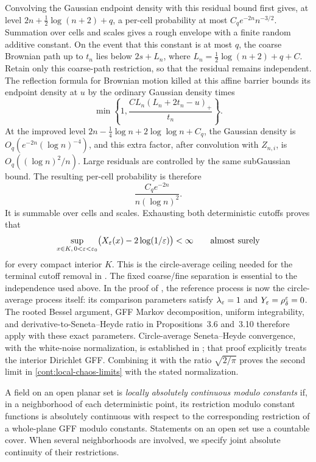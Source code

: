Convolving the Gaussian endpoint density with this residual bound first
gives, at level $2n+\frac12\log(n+2)+q$, a per-cell probability at most
$C_q e^{-2n}n^{-3/2}$.  Summation over cells and scales gives a rough envelope
with a finite random additive constant.  On the event that this constant is
at most $q$, the coarse Brownian path up to $t_n$ lies below
$2s+L_n$, where $L_n=\frac12\log(n+2)+q+C$.  Retain only this coarse-path
restriction, so that the residual remains independent.  The reflection
formula for Brownian motion killed at this affine barrier bounds its
endpoint density at $u$ by the ordinary Gaussian density times
\[
 \min\left\{1,\frac{C L_n(L_n+2t_n-u)_+}{t_n}\right\}.
\]
At the improved level
$2n-\frac14\log n+2\log\log n+C_q$, the Gaussian density is
$O_q(e^{-2n}(\log n)^{-4})$, and this extra factor, after convolution with
$Z_{n,i}$, is $O_q((\log n)^2/n)$.  Large residuals are controlled by the
same subGaussian bound.  The resulting per-cell probability is therefore
\[
                  \frac{C_q e^{-2n}}{n(\log n)^2}.
\]
It is summable over cells and scales.  Exhausting both deterministic cutoffs
proves that
\[
 \sup_{x\in K,\,0<\varepsilon<\varepsilon_0}
       \bigl(X_\varepsilon(x)-2\log(1/\varepsilon)\bigr)<\infty
       \qquad\text{almost surely}
\]
for every compact interior $K$.  This is the circle-average ceiling needed
for the terminal cutoff removal in \cite[Lemma~3.15]{Powell}.  The fixed
coarse/fine separation is essential to the independence used above.
In the proof of \cite[Section~3]{Powell}, the reference process is now the
circle-average process itself: its comparison parameters satisfy
$\lambda_\varepsilon=1$ and $Y_\varepsilon=\rho_\delta^\varepsilon=0$. The rooted Bessel argument,
GFF Markov decomposition, uniform integrability, and derivative-to-Seneta--Heyde
ratio in Propositions~3.6 and~3.10 therefore apply with these exact parameters.
Circle-average Seneta--Heyde convergence, with the white-noise normalization,
is established in \cite[Theorem~4.2 and its proof]{HRVcriticalDisk}; that proof
explicitly treats the interior Dirichlet GFF. Combining it with the ratio
$\sqrt{2/\pi}$ proves the second limit in
\eqref{cont:local-chaos-limits} with the stated normalization.

\begin{definition}\label{cont:local-ac-definition}
A field on an open planar set is \emph{locally absolutely continuous modulo
constants} if, in a neighborhood of each deterministic point, its restriction
modulo constant functions is absolutely continuous with respect to the
corresponding restriction of a whole-plane GFF modulo constants.  Statements
on an open set use a countable cover.  When several neighborhoods are involved,
we specify joint absolute continuity of their restrictions.
\end{definition}

